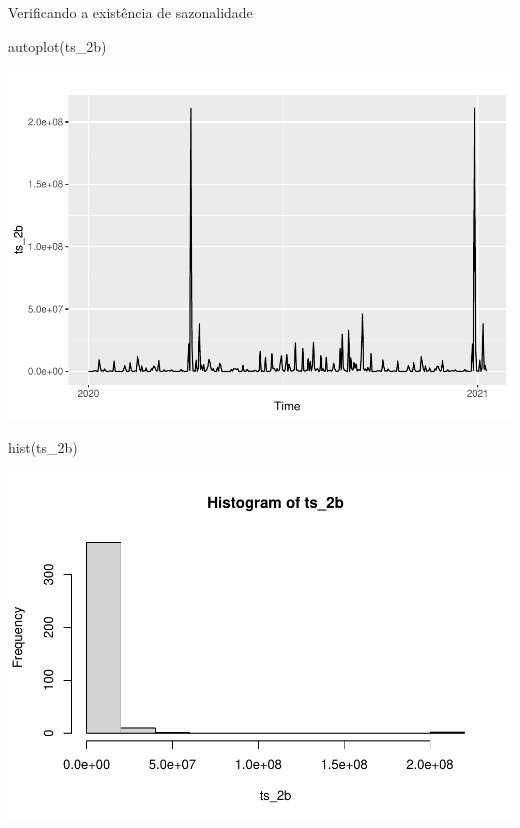 \documentclass[
]{article}
\newenvironment{Shaded}{\begin{snugshade}}{\end{snugshade}}
\newcommand{\FunctionTok}[1]{\textcolor[rgb]{0.00,0.00,0.00}{#1}}
\newcommand{\NormalTok}[1]{#1}
\begin{document}
Verificando a existência de sazonalidade

\begin{Shaded}
\begin{Highlighting}[]
\FunctionTok{autoplot}\NormalTok{(ts\_2b)}
\end{Highlighting}
\end{Shaded}

\includegraphics{Oncase2b_files/figure-latex/unnamed-chunk-4-1.pdf}

\begin{Shaded}
\begin{Highlighting}[]
\FunctionTok{hist}\NormalTok{(ts\_2b)}
\end{Highlighting}
\end{Shaded}

\includegraphics{Oncase2b_files/figure-latex/unnamed-chunk-4-2.pdf}
\end{document}
